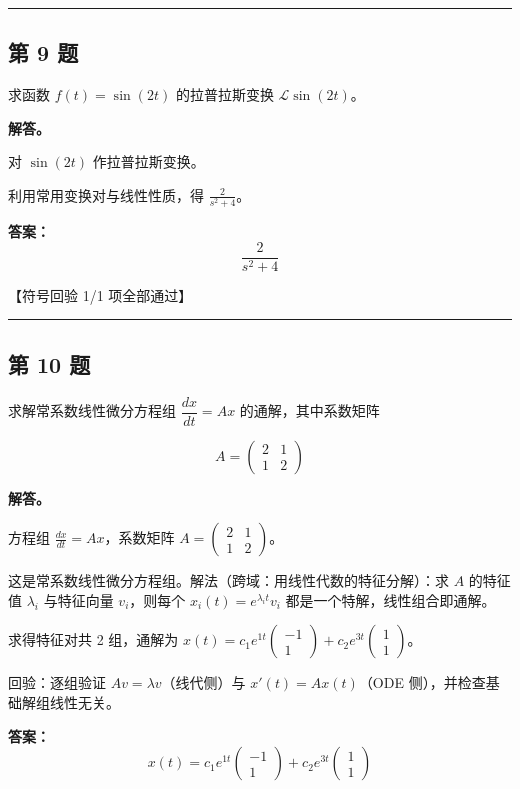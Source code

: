 \documentclass[12pt, a4paper]{article}
\newcommand{\problem}[1]{\subsection*{第 #1 题}}
\newcommand{\solution}{\textbf{解答。}}
\begin{document}
\vspace{0.8em}
\hrule
\vspace{0.8em}

\problem{9}

求函数 $f(t) = \sin(2t)$ 的拉普拉斯变换 $\mathcal{L}{\sin(2t)}$。

\solution

对 $\sin{\left(2 t \right)}$ 作拉普拉斯变换。

利用常用变换对与线性性质，得 $\frac{2}{s^{2} + 4}$。

\textbf{答案：}
\[\boxed{\frac{2}{s^{2} + 4}}\]

\textcolor{okgreen}{【符号回验 1/1 项全部通过】}

\vspace{0.8em}
\hrule
\vspace{0.8em}

\problem{10}

求解常系数线性微分方程组 $\dfrac{dx}{dt} = A x$ 的通解，其中系数矩阵

$$
A = \begin{pmatrix} 2 & 1 \\ 1 & 2 \end{pmatrix}
$$

\solution

方程组 $\frac{dx}{dt} = Ax$，系数矩阵 $A = \begin{pmatrix} 2 & 1 \\ 1 & 2 \end{pmatrix}$。

这是常系数线性微分方程组。解法（跨域：用线性代数的特征分解）：求 $A$ 的特征值 $\lambda_i$ 与特征向量 $v_i$，则每个 $x_i(t) = e^{\lambda_i t} v_i$ 都是一个特解，线性组合即通解。

求得特征对共 2 组，通解为 $x(t) = c_1 e^{1 t} \begin{pmatrix} -1 \\ 1 \end{pmatrix} + c_2 e^{3 t} \begin{pmatrix} 1 \\ 1 \end{pmatrix}$。

回验：逐组验证 $Av = \lambda v$（线代侧）与 $x'(t) = Ax(t)$（ODE 侧），并检查基础解组线性无关。

\textbf{答案：}
{\small
\[x(t) = c_1 e^{1 t} \begin{pmatrix} -1 \\ 1 \end{pmatrix} + c_2 e^{3 t} \begin{pmatrix} 1 \\ 1 \end{pmatrix}\]
}
\end{document}
